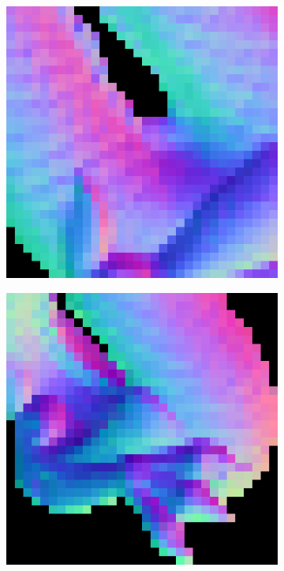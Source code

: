 \begin{figure}[H]
\begin{subfigure}[b]{0.18\linewidth}
	\end{subfigure}
	\begin{subfigure}[b]{0.18\linewidth}
		\includegraphics[width=\linewidth]{./Figures/trip_net_zoom_in/eval_7_32_12_normal.png}
	\end{subfigure}
	\begin{subfigure}[b]{0.18\linewidth}
		\includegraphics[width=\linewidth]{./Figures/trip_net_zoom_in/eval_7_42_-28_normal.png}

\end{subfigure}
\end{figure}
